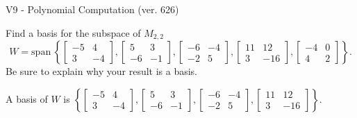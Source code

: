 \begin{exercise}
  \begin{exerciseTitle}V9 - Polynomial Computation (ver. 626)\end{exerciseTitle}
  \begin{exerciseStatement}
    Find a basis for the subspace of \(M_{2,2}\) 
\[W=\mathrm{span}\ \left\{\left[\begin{array}{cc}
-5 & 4 \\
3 & -4
\end{array}\right] , \left[\begin{array}{cc}
5 & 3 \\
-6 & -1
\end{array}\right] , \left[\begin{array}{cc}
-6 & -4 \\
-2 & 5
\end{array}\right] , \left[\begin{array}{cc}
11 & 12 \\
3 & -16
\end{array}\right] , \left[\begin{array}{cc}
-4 & 0 \\
4 & 2
\end{array}\right]\right\}.\]
 Be sure to explain why your result is a basis.


  \end{exerciseStatement}
  \begin{exerciseAnswer}
   A basis of \(W\) is  \(\left\{\left[\begin{array}{cc}
-5 & 4 \\
3 & -4
\end{array}\right] , \left[\begin{array}{cc}
5 & 3 \\
-6 & -1
\end{array}\right] , \left[\begin{array}{cc}
-6 & -4 \\
-2 & 5
\end{array}\right] , \left[\begin{array}{cc}
11 & 12 \\
3 & -16
\end{array}\right]\right\}\).
  


  \end{exerciseAnswer}
\end{exercise}